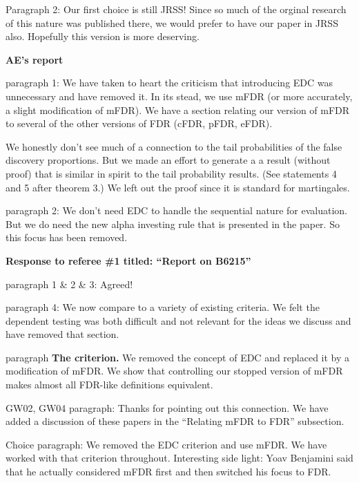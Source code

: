 \documentclass[12pt]{letter}
\begin{document}
Paragraph 2: Our first choice is still JRSS!  Since so much of the
 orginal research of this nature was published there, we would prefer to
 have our paper in JRSS also.  Hopefully this version is more
 deserving.



\newpage
\centerline{\bf AE's report}

paragraph 1: We have taken to heart the criticism that introducing EDC
was unnecessary and have removed it.  In its stead, we use mFDR
(or more accurately, a slight modification of mFDR).  We have a
section relating our version of mFDR to several of the other versions
of FDR (cFDR, pFDR, eFDR).

We honestly don't see much of a connection to the tail probabilities
of the false discovery proportions.  But we made an effort to generate
a a result (without proof) that is similar in spirit to the tail
probability results.  (See statements 4 and 5 after theorem 3.)  We
left out the proof since it is standard for martingales.

paragraph 2: We don't need EDC to handle the sequential nature for
evaluation.  But we do need the new alpha investing rule that is
presented in the paper.  So this focus has been removed.



\newpage
\centerline{\bf Response to referee \#1 titled: ``Report on B6215''}

paragraph 1 \& 2 \& 3: Agreed!

paragraph 4: We now compare to a variety of existing criteria.  We
felt the dependent testing was both difficult and not relevant
for the ideas we discuss and have removed that section.

paragraph {\bf The criterion.} We removed the concept of EDC and
 replaced it by a modification of mFDR.  We show that controlling our
 stopped version of mFDR makes almost all FDR-like definitions
 equivalent.

GW02, GW04 paragraph: Thanks for pointing out this connection.  We
have added a discussion of these papers in the ``Relating mFDR to
FDR'' subsection.  

Choice paragraph: We removed the EDC criterion and use mFDR. 
We have worked with that criterion throughout.  Interesting side light: 
Yoav Benjamini said that he actually considered mFDR first and then
switched his focus to FDR.
\end{document}
